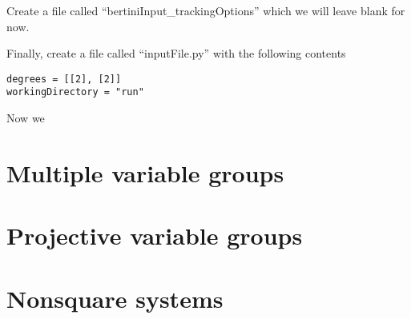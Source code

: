 \documentclass[12pt]{article}
\begin{document}
Create a file called ``bertiniInput\_trackingOptions'' which we will 
leave blank for now.

Finally, create a file called ``inputFile.py'' with the following 
contents
\begin{lstlisting}
degrees = [[2], [2]]
workingDirectory = "run"
\end{lstlisting}

Now we 

\section{Multiple variable groups}
\section{Projective variable groups}
\section{Nonsquare systems}
\end{document}
